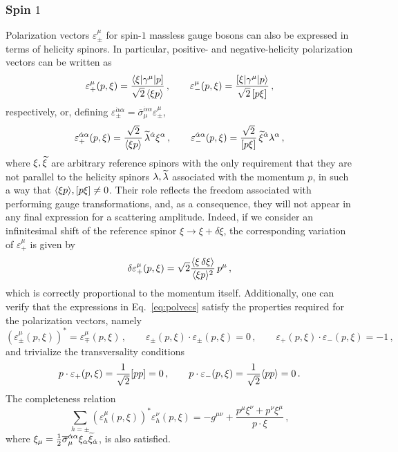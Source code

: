 \subsubsection{Spin $1$}

Polarization vectors $\varepsilon_{\pm}^\mu$ for spin-$1$ massless gauge bosons can also be expressed in terms of helicity spinors.
In particular, positive- and negative-helicity polarization vectors can be written as
\begin{equation}\label{eq:polvecs}
    \varepsilon^\mu_+(p,\xi) = \frac{\langle \xi |\gamma^\mu|p]}{\sqrt{2}\,\langle \xi p \rangle}\,,
    \qquad 
    \varepsilon^\mu_-(p,\xi) = \frac{[\xi|\gamma^\mu|p\rangle}{\sqrt{2}\,\lbrack p \xi \rbrack}
    \,,
\end{equation}
respectively, or, defining $\varepsilon_{\pm}^{\dot\alpha\alpha} = \overline \sigma_\mu^{\dot\alpha\alpha}\varepsilon_{\pm}^\mu$,
\begin{equation}\label{eq:polvecsmat}
    \varepsilon_{+}^{\dot\alpha\alpha}(p,\xi) = \frac{\sqrt{2}}{\langle \xi p \rangle} \,\widetilde{\lambda}^{\dot\alpha}\xi^\alpha\,,
    \qquad
    \varepsilon_{-}^{\dot\alpha\alpha}(p,\xi) = \frac{\sqrt{2}}{\lbrack p \xi \rbrack} \,\widetilde{\xi}^{\dot\alpha}\lambda^\alpha\,,
\end{equation}
where $\xi,\widetilde{\xi}$ are arbitrary reference spinors with the only requirement that they are not parallel to the helicity spinors $\lambda,\widetilde{\lambda}$ associated with the momentum $p$, in such a way that $\langle \xi p \rangle,\lbrack p \xi \rbrack\neq 0$.
Their role reflects the freedom associated with performing gauge transformations, and, as a consequence, they will not appear in any final expression for a scattering amplitude.
Indeed, if we consider an infinitesimal shift of the reference spinor $\xi \to \xi + \delta\xi$, the corresponding variation of $\varepsilon^\mu_+$ is given by
\begin{equation}
    \delta\varepsilon^\mu_+(p,\xi) = \sqrt{2}\frac{\langle \xi\, \delta\xi \rangle}{\langle \xi p \rangle^2}\,p^\mu\,,
\end{equation}
which is correctly proportional to the momentum itself.
Additionally, one can verify that the expressions in Eq.~\eqref{eq:polvecs} satisfy the properties required for the polarization vectors, namely
\begin{equation}
    (\varepsilon^\mu_{\pm}(p,\xi))^* = \varepsilon^\mu_{\mp}(p,\xi)\,,
    \qquad
    \varepsilon_\pm(p,\xi) \cdot \varepsilon_{\pm} (p,\xi) = 0\,,
    \qquad
    \varepsilon_+(p,\xi) \cdot \varepsilon_{-} (p,\xi) = -1\,,
\end{equation}
and trivialize the transversality conditions
\begin{equation}
    p\cdot \varepsilon_+(p,\xi) = \frac{1}{\sqrt{2}}\lbrack p p \rbrack=0\,,
    \qquad
    p\cdot \varepsilon_-(p,\xi) = \frac{1}{\sqrt{2}}\langle p p \rangle=0\,.
\end{equation}
The completeness relation
\begin{equation}
    \sum_{h=\pm} (\varepsilon^\mu_h(p,\xi))^* \varepsilon^\nu_h(p,\xi) = -g^{\mu\nu}+\frac{p^\mu \xi^\nu + p^\nu \xi^\mu}{p\cdot \xi}\,,
\end{equation}
where $\xi_\mu = \frac{1}{2}\overline\sigma_\mu^{\dot\alpha\alpha}\xi_\alpha\widetilde{\xi}_{\dot\alpha}$,
is also satisfied.

